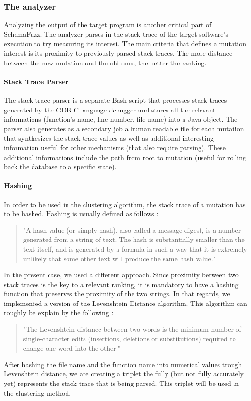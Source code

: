 \documentclass{article}
\begin{document}
\begin{empfile}
\bigskip
			\subsubsection{The analyzer}
Analyzing the output of the target program is another critical part of SchemaFuzz. The analyzer parses in the stack trace of the target software's execution to try measuring its interest. The main criteria that defines a mutation interest is its proximity to previously parsed stack traces. The more distance between the new mutation and the old ones, the better the ranking. 
				\paragraph{Stack Trace Parser}
The stack trace parser is a separate Bash script that processes stack traces generated by the GDB C language debugger and stores all the relevant informations (function's name, line number, file name) into a Java object. The parser also generates as a secondary job a human readable file for each mutation that synthesizes the stack trace values as well as additional interesting information useful for other mechanisms (that also require parsing). These additional informations include the path from root to mutation (useful for rolling back the database to a specific state).
				\paragraph{Hashing}
In order to be used in the clustering algorithm, the stack trace of a mutation has to be hashed.
Hashing is usually defined as follows : 
				\begin{quotation}
"A hash value (or simply hash), also called a message digest, is a number generated from a string of text. The hash is substantially smaller than the text itself, and is generated by a formula in such a way that it is extremely unlikely that some other text will produce the same hash value."
				\end{quotation}
				
In the present case, we used a different approach. Since proximity between two stack traces is the key to a relevant ranking, it is mandatory to have a hashing function that preserves the proximity of the two strings. 
In that regards, we implemented a version of the Levenshtein Distance algorithm.
This algorithm can roughly be explain by the following :
				\begin{quotation}
"The Levenshtein distance between two words is the minimum number of single-character edits (insertions, deletions or substitutions) required to change one word into the other."
				\end{quotation}				 
After hashing the file name and the function name into numerical values trough Levenshtein distance, we are creating a triplet the fully (but not fully accurately yet) represents the stack trace that is being parsed. This triplet will be used in the clustering method. 


\end{empfile}
\end{document}

